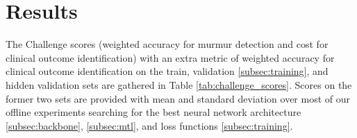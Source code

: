 \section{Results}
\label{sec:results}

The Challenge scores (weighted accuracy for murmur detection and cost for clinical outcome identification) with an extra metric of weighted accuracy for clinical outcome identification on the train, validation \ref{subsec:training}, and hidden validation sets are gathered in Table \ref{tab:challenge_scores}. Scores on the former two sets are provided with mean and standard deviation over most of our offline experiments searching for the best neural network architecture \ref{subsec:backbone}, \ref{subsec:mtl}, and loss functions \ref{subsec:training}.


